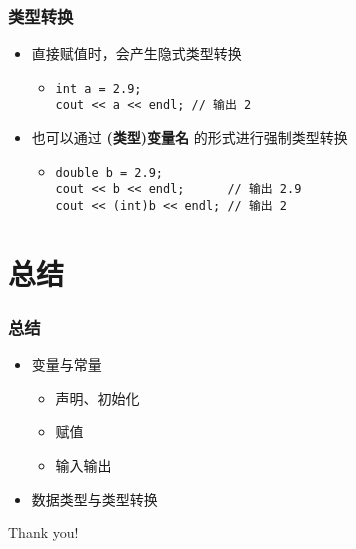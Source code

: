 \begin{frame}[fragile]
    \frametitle{类型转换}

    \begin{itemize}
        \item<1-> 直接赋值时，会产生隐式类型转换

            \begin{itemize}
                \item
                    \lstinline|int a = 2.9;|\\
                    \lstinline|cout << a << endl; // 输出 2|
            \end{itemize}

        \item<2-> 也可以通过 \textbf{(类型)变量名} 的形式进行强制类型转换

            \begin{itemize}
                \item
                    \lstinline|double b = 2.9;|\\
                    \lstinline|cout << b << endl;      // 输出 2.9|\\
                    \lstinline|cout << (int)b << endl; // 输出 2|
            \end{itemize}

    \end{itemize}
\end{frame}


\section{总结}

\begin{frame}[fragile]
    \frametitle{总结}

    \begin{itemize}
        \item 变量与常量
            \begin{itemize}
                \item 声明、初始化
                \item 赋值
                \item 输入输出
            \end{itemize}

        \item 数据类型与类型转换
    \end{itemize}
\end{frame}

\begin{frame}
    \begin{center}
        {\Huge Thank you!}
    \end{center}
\end{frame}



